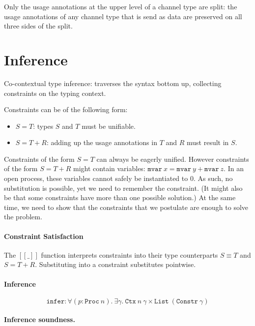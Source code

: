 \documentclass[sigplan,review,screen]{acmart}
\begin{document}
Only the usage annotations at the upper level of a channel type are
split: the usage annotations of any channel type that is send as data
are preserved on all three sides of the split.

\hypertarget{inference}{%
\section{Inference}\label{inference}}

Co-contextual type inference: traverses the syntax bottom up, collecting
constraints on the typing context.

Constraints can be of the following form:

\begin{itemize}
\item
  \(S = T\): types \(S\) and \(T\) must be unifiable.
\item
  \(S = T + R\): adding up the usage annotations in \(T\) and \(R\) must
  result in \(S\).
\end{itemize}

Constraints of the form \(S = T\) can always be eagerly unified. However
constraints of the form \(S = T + R\) might contain variables:
\(\texttt{mvar}~x = \texttt{mvar}~y + \texttt{mvar}~z\). In an open
process, these variables cannot safely be instantiated to \(0\). As
such, no substitution is possible, yet we need to remember the
constraint. (It might also be that some constraints have more than one
possible solution.) At the same time, we need to show that the
constraints that we postulate are enough to solve the problem.

\paragraph{Constraint Satisfaction}

The \([\![\_]\!]\) function interprets constraints into their type
counterparts \(S \equiv T\) and \(S = T + R\). Substituting into a
constraint substitutes pointwise.

\paragraph{Inference}

\[
\texttt{infer} : \forall (p : \texttt{Proc}~n). ~ \exists \gamma. ~ \texttt{Ctx}~n~\gamma \times \texttt{List}~(\texttt{Constr}~\gamma)
\]

\paragraph{Inference soundness.}
\end{document}
